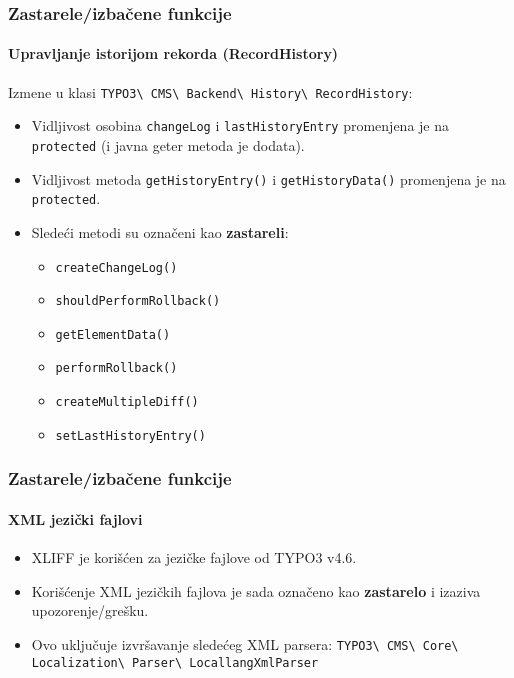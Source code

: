 \begin{frame}[fragile]
	\frametitle{Zastarele/izbačene funkcije}
	\framesubtitle{Upravljanje istorijom rekorda (RecordHistory)}

	Izmene u klasi
		\smaller
			\texttt{TYPO3\textbackslash
				CMS\textbackslash
				Backend\textbackslash
				History\textbackslash
				RecordHistory}:
		\normalsize

	\begin{itemize}

		\item Vidljivost osobina \texttt{changeLog} i \texttt{lastHistoryEntry}
			promenjena je na \texttt{protected} (i javna geter metoda je dodata).
		\item Vidljivost metoda \texttt{getHistoryEntry()} i \texttt{getHistoryData()}
			promenjena je na \texttt{protected}.
		\item Sledeći metodi su označeni kao \textbf{zastareli}:

			\begin{itemize}\smaller
				\item \texttt{createChangeLog()}
				\item \texttt{shouldPerformRollback()}
				\item \texttt{getElementData()}
				\item \texttt{performRollback()}
				\item \texttt{createMultipleDiff()}
				\item \texttt{setLastHistoryEntry()}
			\end{itemize}\normalsize

	\end{itemize}

\end{frame}


\begin{frame}[fragile]
	\frametitle{Zastarele/izbačene funkcije}
	\framesubtitle{XML jezički fajlovi}

	\begin{itemize}
		\item XLIFF je korišćen za jezičke fajlove od TYPO3 v4.6.
		\item Korišćenje XML jezičkih fajlova je sada označeno kao \textbf{zastarelo}
			 i izaziva upozorenje/grešku.
		\item Ovo uključuje izvršavanje sledećeg XML parsera:\newline
			\small
				\texttt{TYPO3\textbackslash
					CMS\textbackslash
					Core\textbackslash
					Localization\textbackslash
					Parser\textbackslash
					LocallangXmlParser}
			\normalsize
	\end{itemize}

\end{frame}

